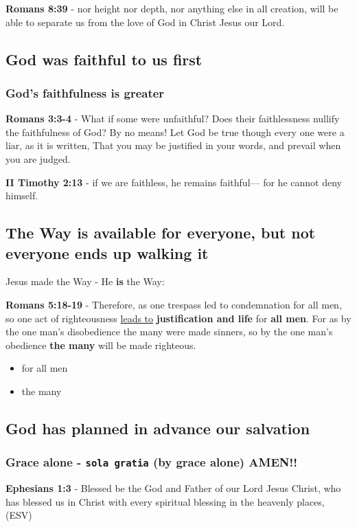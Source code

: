 \documentclass[11pt]{article}
\begin{document}
\textbf{Romans 8:39} - nor height nor depth, nor anything else in all creation, will be able to separate us from the love of God in Christ Jesus our Lord.

\subsection{God was faithful to us first}
\label{sec:org306cab9}
\subsubsection{God's faithfulness is greater}
\label{sec:org2d240f0}
\textbf{Romans 3:3-4} - What if some were unfaithful? Does their faithlessness nullify the faithfulness of God? By no means! Let God be true though every one were a liar, as it is written, That you may be justified in your words, and prevail when you are judged.

\textbf{II Timothy 2:13} - if we are faithless, he remains faithful— for he cannot deny himself.

\subsection{The Way is available for everyone, but not everyone ends up walking it}
\label{sec:org6369fbc}
Jesus made the Way - He \textbf{is} the Way:

\textbf{Romans 5:18-19} - Therefore, as one trespass led to condemnation for all men, so one act of righteousness \uline{leads to} \textbf{justification and life} for \textbf{all men}. For as by the one man's disobedience the many were made sinners, so by the one man's obedience \textbf{the many} will be made righteous.

\begin{itemize}
\item for all men
\item the many
\end{itemize}

\subsection{God has planned in advance our salvation}
\label{sec:orgeb7aed0}
\subsubsection{Grace alone - \texttt{sola gratia} (by grace alone) AMEN!!}
\label{sec:org680735f}
\textbf{Ephesians 1:3} - Blessed be the God and Father of our Lord Jesus Christ, who has blessed us in Christ with every spiritual blessing in the heavenly places, (ESV)
\end{document}
